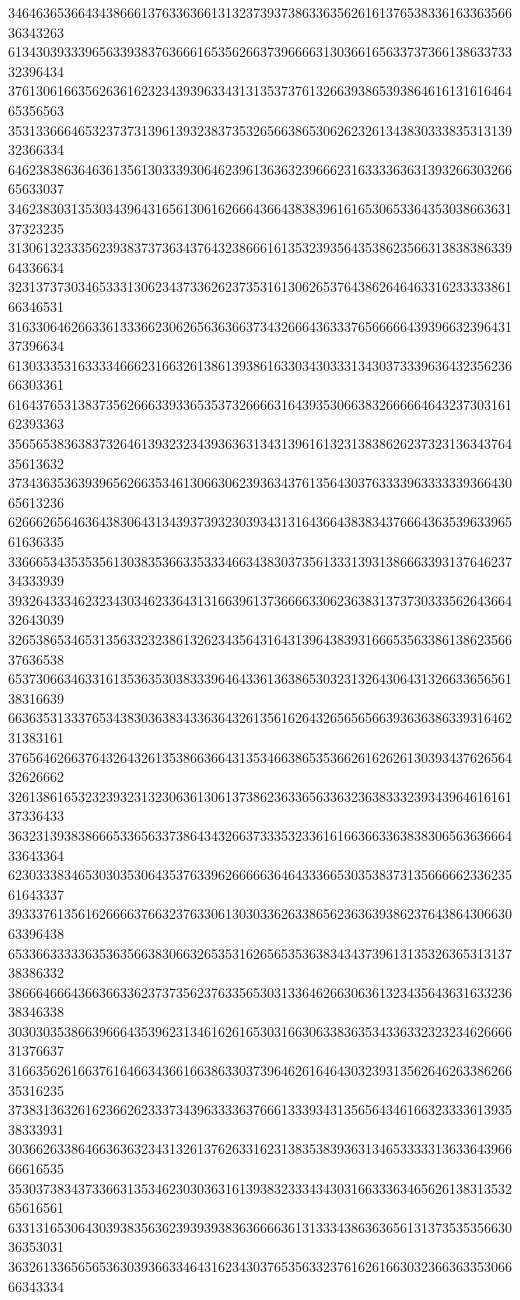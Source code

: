34646365366434386661376336366131323739373863363562616137653833616336356636343263
61343039333965633938376366616535626637396666313036616563373736613863373332396434
37613061663562636162323439396334313135373761326639386539386461613161646465356563
35313366646532373731396139323837353265663865306262326134383033383531313932366334
64623838636463613561303339306462396136363239666231633336363139326630326665633037
34623830313530343964316561306162666436643838396161653065336435303866363137323235
31306132333562393837373634376432386661613532393564353862356631383838633964336634
32313737303465333130623437336262373531613062653764386264646331623333386166346531
31633064626633613336623062656363663734326664363337656666643939663239643137396634
61303335316333346662316632613861393861633034303331343037333963643235623666303361
61643765313837356266633933653537326666316439353066383266666464323730316162393363
35656538363837326461393232343936363134313961613231383862623732313634376435613632
37343635363939656266353461306630623936343761356430376333396333333936643065613236
62666265646364383064313439373932303934313164366438383437666436353963396561636335
33666534353535613038353663353334663438303735613331393138666339313764623734333939
39326433346232343034623364313166396137366663306236383137373033356264366432643039
32653865346531356332323861326234356431643139643839316665356338613862356637636538
65373066346331613536353038333964643361363865303231326430643132663365656138316639
66363531333765343830363834336364326135616264326565656639363638633931646231383161
37656462663764326432613538663664313534663865353662616262613039343762656432626662
32613861653232393231323063613061373862363365633632363833323934396461616137336433
36323139383866653365633738643432663733353233616166366336383830656363666433643364
62303338346530303530643537633962666663646433366530353837313566666233623561643337
39333761356162666637663237633061303033626338656236363938623764386430663063396438
65336633333635363566383066326535316265653536383434373961313532636531313738386332
38666466643663663362373735623763356530313364626630636132343564363163323638346338
30303035386639666435396231346162616530316630633836353433633232323462666631376637
31663562616637616466343661663863303739646261646430323931356264626338626635316235
37383136326162366262333734396333363766613339343135656434616632333361393538333931
30366263386466363632343132613762633162313835383936313465333331363364396666616535
35303738343733663135346230303631613938323334343031663336346562613831353265616561
63313165306430393835636239393938363666636131333438636365613137353535663036353031
36326133656565363039366334643162343037653563323761626166303236636335306666343334
